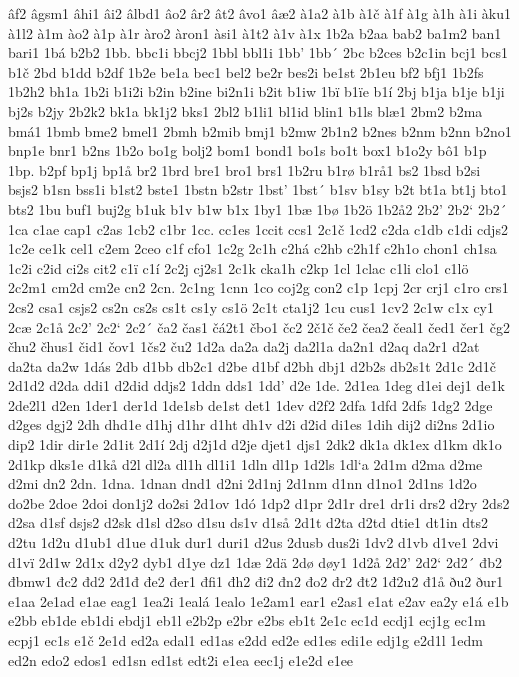 âf2
âgsm1
âhi1
âi2
âlbd1
âo2
âr2
ât2
âvo1
âæ2
à1a2
à1b
à1č
à1f
à1g
à1h
à1i
àku1
à1l2
à1m
ào2
à1p
à1r
àro2
àron1
àsi1
à1t2
à1v
à1x
1b2a
b2aa
bab2
ba1m2
ban1
bari1
1bá
b2b2
1bb.
bbc1i
bbcj2
1bbl
bbl1i
1bb'
1bb´
2bc
b2ces
b2c1in
bcj1
bcs1
b1č
2bd
b1dd
b2df
1b2e
be1a
bec1
bel2
be2r
bes2i
be1st
2b1eu
bf2
bfj1
1b2fs
1b2h2
bh1a
1b2i
b1i2i
b2in
b2ine
bi2n1i
b2it
b1iw
1bï
b1ïe
b1í
2bj
b1ja
b1je
b1ji
bj2s
b2jy
2b2k2
bk1a
bk1j2
bks1
2bl2
b1li1
bl1id
blin1
b1ls
blæ1
2bm2
b2ma
bmá1
1bmb
bme2
bmel1
2bmh
b2mib
bmj1
b2mw
2b1n2
b2nes
b2nm
b2nn
b2no1
bnp1e
bnr1
b2ns
1b2o
bo1g
bolj2
bom1
bond1
bo1s
bo1t
box1
b1o2y
bô1
b1p
1bp.
b2pf
bp1j
bp1å
br2
1brd
bre1
bro1
brs1
1b2ru
b1rø
b1rå1
bs2
1bsd
b2si
bsjs2
b1sn
bss1i
b1st2
bste1
1bstn
b2str
1bst'
1bst´
b1sv
b1sy
b2t
bt1a
bt1j
bto1
bts2
1bu
buf1
buj2g
b1uk
b1v
b1w
b1x
1by1
1bæ
1bø
1b2ö
1b2å2
2b2'
2b2`
2b2´
1ca
c1ae
cap1
c2as
1cb2
c1br
1cc.
cc1es
1ccit
ccs1
2c1č
1cd2
c2da
c1db
c1di
cdjs2
1c2e
ce1k
cel1
c2em
2ceo
c1f
cfo1
1c2g
2c1h
c2há
c2hb
c2h1f
c2h1o
chon1
ch1sa
1c2i
c2id
ci2s
cit2
c1ï
c1í
2c2j
cj2s1
2c1k
cka1h
c2kp
1cl
1clac
c1li
clo1
c1lö
2c2m1
cm2d
cm2e
cn2
2cn.
2c1ng
1cnn
1co
coj2g
con2
c1p
1cpj
2cr
crj1
c1ro
crs1
2cs2
csa1
csjs2
cs2n
cs2s
cs1t
cs1y
cs1ö
2c1t
cta1j2
1cu
cus1
1cv2
2c1w
c1x
cy1
2cæ
2c1å
2c2'
2c2`
2c2´
ča2
čas1
čá2t1
čbo1
čc2
2č1č
če2
čea2
čeal1
čed1
čer1
čg2
čhu2
čhus1
čid1
čov1
1čs2
ču2
1d2a
da2a
da2j
da2l1a
da2n1
d2aq
da2r1
d2at
da2ta
da2w
1dás
2db
d1bb
db2c1
d2be
d1bf
d2bh
dbj1
d2b2s
db2s1t
2d1c
2d1č
2d1d2
d2da
ddi1
d2did
ddjs2
1ddn
dds1
1dd'
d2e
1de.
2d1ea
1deg
d1ei
dej1
de1k
2de2l1
d2en
1der1
der1d
1de1sb
de1st
det1
1dev
d2f2
2dfa
1dfd
2dfs
1dg2
2dge
d2ges
dgj2
2dh
dhd1e
d1hj
d1hr
d1ht
dh1v
d2i
d2id
di1es
1dih
dij2
di2ns
2d1io
dip2
1dir
dir1e
2d1it
2d1í
2dj
d2j1d
d2je
djet1
djs1
2dk2
dk1a
dk1ex
d1km
dk1o
2d1kp
dks1e
d1kå
d2l
dl2a
dl1h
dl1i1
1dln
dl1p
1d2ls
1dl`a
2d1m
d2ma
d2me
d2mi
dn2
2dn.
1dna.
1dnan
dnd1
d2ni
2d1nj
2d1nm
d1nn
d1no1
2d1ns
1d2o
do2be
2doe
2doi
don1j2
do2si
2d1ov
1dó
1dp2
d1pr
2d1r
dre1
dr1i
drs2
d2ry
2ds2
d2sa
d1sf
dsjs2
d2sk
d1sl
d2so
d1su
ds1v
d1så
2d1t
d2ta
d2td
dtie1
dt1in
dts2
d2tu
1d2u
d1ub1
d1ue
d1uk
dur1
duri1
d2us
2dusb
dus2i
1dv2
d1vb
d1ve1
2dvi
d1vï
2d1w
2d1x
d2y2
dyb1
d1ye
dz1
1dæ
2dä
2dø
døy1
1d2å
2d2'
2d2`
2d2´
đb2
đbmw1
đc2
đd2
2đ1đ
đe2
đer1
đfi1
đh2
đi2
đn2
đo2
đr2
đt2
1đ2u2
đ1å
ðu2
ður1
e1aa
2e1ad
e1ae
eag1
1ea2i
1ealá
1ealo
1e2am1
ear1
e2as1
e1at
e2av
ea2y
e1á
e1b
e2bb
eb1de
eb1di
ebdj1
eb1l
e2b2p
e2br
e2bs
eb1t
2e1c
ec1d
ecdj1
ecj1g
ec1m
ecpj1
ec1s
e1č
2e1d
ed2a
edal1
ed1as
e2dd
ed2e
ed1es
edi1e
edj1g
e2d1l
1edm
ed2n
edo2
edos1
ed1sn
ed1st
edt2i
e1ea
eec1j
e1e2d
e1ee
